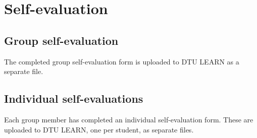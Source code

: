 \documentclass{article}
\begin{document}
\fi

\section{Self-evaluation}
\label{sec:appendix-self-eval}

\subsection*{Group self-evaluation}

The completed group self-evaluation form is uploaded to DTU LEARN as a separate file.


\subsection*{Individual self-evaluations}

Each group member has completed an individual self-evaluation form. These are uploaded to DTU LEARN, one per student, as separate files.


\ifdefined\mainfile\else
\end{document}
